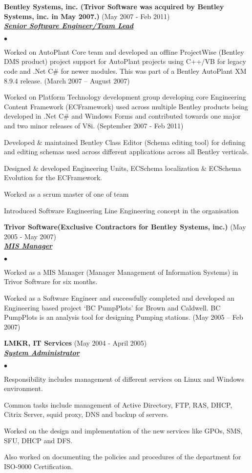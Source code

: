 \documentclass{article}
\newcommand{\employer}[3]{{ \textbf{#1} (#2)\\ \underline{\textbf{\emph{#3}}}\\  }}
\newenvironment{achievements}{\begin{list}{$\bullet$}{\topsep 0pt \itemsep -2pt}}{\vspace*{4pt}\end{list}}
\begin{document}
\employer{Bentley Systems, inc. (Trivor Software was acquired by Bentley Systems, inc. in May 2007.)}{May 2007 - Feb 2011}{Senior Software Engineer/Team Lead}
	\begin{achievements}
	\item Worked on AutoPlant Core team and developed an offline ProjectWise (Bentley DMS product) project support for AutoPlant projects using C++/VB for legacy code and .Net C\# for newer modules. This was part of a Bentley AutoPlant XM 8.9.4 release. (March 2007 – August 2007)
	\item Worked on Platform Technology development group developing core Engineering Content Framework (ECFramework) used across multiple Bentley products being developed in .Net C\# and Windows Forms and contributed towards one major and two minor releases of V8i. (September 2007 - Feb 2011)
	\item Developed \& maintained Bentley Class Editor (Schema editing tool) for defining and editing schemas used across different applications across all Bentley verticals.
	\item Designed \& developed Engineering Units, ECSchema localization \& ECSchema Evolution for the ECFramework.
	\item Worked as a scrum master of one of team
	\item Introduced Software Engineering Line Engineering concept in the organisation
	\end{achievements}

\employer{Trivor Software(Exclusive Contractors for Bentley Systems, inc.)}{May 2005 - May 2007}{MIS Manager}
	\begin{achievements}
	\item Worked as a MIS Manager (Manager Management of Information Systems) in Trivor Software for six months.  
	\item Worked as a Software Engineer and successfully completed and developed an Engineering based project ‘BC PumpPlots’ for Brown and Caldwell. BC PumpPlots is an analysis tool for designing Pumping stations. (May 2005 – Feb 2007) 
	\end{achievements}

\clearpage

\employer{LMKR, IT Services}{May 2004 - April 2005}{System Administrator}
	\begin{achievements}
	\item Responsibility includes management of different services on Linux and Windows environment.
	\item Common tasks include management of Active Directory, FTP, RAS, DHCP, Citrix Server, squid proxy, DNS and backup of servers.
	\item Worked on the design and implementation of the new services like GPOs, SMS, SFU, DHCP and DFS. 
	\item Also worked on documenting the policies and procedures of the department for ISO-9000 Certification. 
	\end{achievements}
\end{document}
